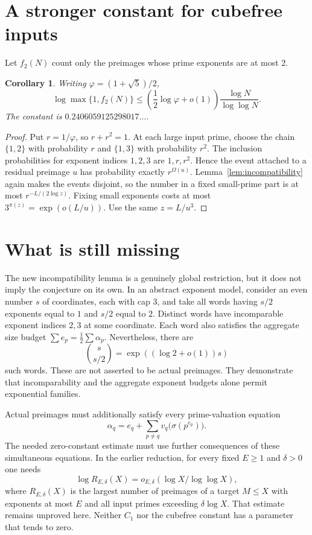 \documentclass[11pt,a4paper]{article}
\newtheorem{corollary}[theorem]{Corollary}
\theoremstyle{remark}\newtheorem*{remark}{Remark}
\begin{document}
\section{A stronger constant for cubefree inputs}
Let $f_2(N)$ count only the preimages whose prime exponents are at most $2$.
\begin{corollary}
Writing $\varphi=(1+\sqrt5)/2$,
\[
\boxed{\log\max\{1,f_2(N)\}\le
\left(\frac12\log\varphi+o(1)\right)\frac{\log N}{\log\log N}.}
\]
The constant is $0.2406059125298017\ldots$.
\end{corollary}
\begin{proof}
Put $r=1/\varphi$, so $r+r^2=1$. At each large input prime, choose the chain $\{1,2\}$ with probability $r$ and $\{1,3\}$ with probability $r^2$. The inclusion probabilities for exponent indices $1,2,3$ are $1,r,r^2$. Hence the event attached to a residual preimage $u$ has probability exactly $r^{\Omega(u)}$. Lemma~\ref{lem:incompatibility} again makes the events disjoint, so the number in a fixed small-prime part is at most $r^{-L/(2\log z)}$. Fixing small exponents costs at most $3^{\pi(z)}=\exp(o(L/u))$. Use the same $z=L/u^3$.
\end{proof}

\section{What is still missing}
The new incompatibility lemma is a genuinely global restriction, but it does not imply the conjecture on its own. In an abstract exponent model, consider an even number $s$ of coordinates, each with cap $3$, and take all words having $s/2$ exponents equal to $1$ and $s/2$ equal to $2$. Distinct words have incomparable exponent indices $2,3$ at some coordinate. Each word also satisfies the aggregate size budget $\sum e_p=\frac12\sum\alpha_p$. Nevertheless, there are
\[
\binom{s}{s/2}=\exp((\log2+o(1))s)
\]
such words. These are not asserted to be actual preimages. They demonstrate that incomparability and the aggregate exponent budgets alone permit exponential families.

Actual preimages must additionally satisfy every prime-valuation equation
\[
\alpha_q=e_q+\sum_{p\ne q}v_q\bigl(\sigma(p^{e_p})\bigr).
\]
The needed zero-constant estimate must use further consequences of these simultaneous equations. In the earlier reduction, for every fixed $E\ge1$ and $\delta>0$ one needs
\[
\log R_{E,\delta}(X)=o_{E,\delta}(\log X/\log\log X),
\]
where $R_{E,\delta}(X)$ is the largest number of preimages of a target $M\le X$ with exponents at most $E$ and all input primes exceeding $\delta\log X$. That estimate remains unproved here. Neither $C_1$ nor the cubefree constant has a parameter that tends to zero.
\end{document}
